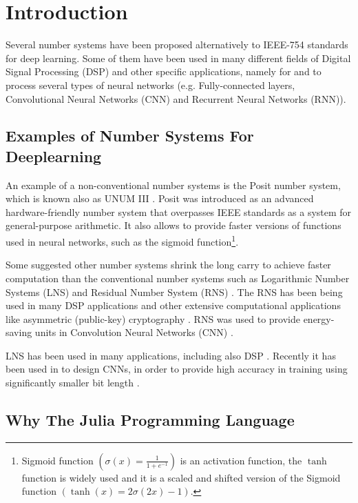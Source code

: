 \section{Introduction}

Several number systems have been proposed alternatively to IEEE-754 standards \cite{754} for deep learning. Some of them have been used in many different fields of Digital Signal Processing (DSP) and other specific applications, namely for and to process several types of neural networks (e.g. Fully-connected layers, Convolutional Neural Networks (CNN) and Recurrent Neural Networks (RNN)).

\subsection{Examples of Number Systems For Deeplearning}

An example of a non-conventional number systems is the Posit number system, which is known also as UNUM III \cite{Gustafson2017}. Posit was introduced as an advanced hardware-friendly number system that overpasses IEEE standards as a system for general-purpose arithmetic. It also allows to provide faster versions of functions used in neural networks, such as the sigmoid function\footnote{Sigmoid function $\left(\sigma(x) = \frac{1}{1 + e^{-1}}\right)$ is an activation function, the $\tanh$ function is widely used and it is a scaled and shifted version of the Sigmoid function $\left(\tanh(x) = 2 \sigma(2x) -1\right)$.}.

Some suggested other number systems shrink the long carry to achieve faster computation than the conventional number systems such as Logarithmic Number Systems (LNS) \cite{Kingsbury1971} and Residual Number System (RNS) \cite{Garner1959}. The RNS has been being used in many DSP applications \cite{Cardarilli2007,Chaves2003,Claudio1995,DiClaudio1990,Jullien1987} and other extensive computational applications like asymmetric (public-key) cryptography \cite{Sousa2016}. RNS was used to provide energy-saving units in Convolution Neural Networks (CNN) \cite{Samimi2020}.

LNS \cite{Kingsbury1971,Alexopoulos1975,Lee1977} has been used in many applications, including also DSP \cite{Dimitrov2001,Lewis1995}. Recently it has been used in to design CNNs, in order to provide high accuracy in training using significantly smaller bit length \cite{Miyashita2016,Juang2019}.

\subsection{Why The Julia Programming Language}

